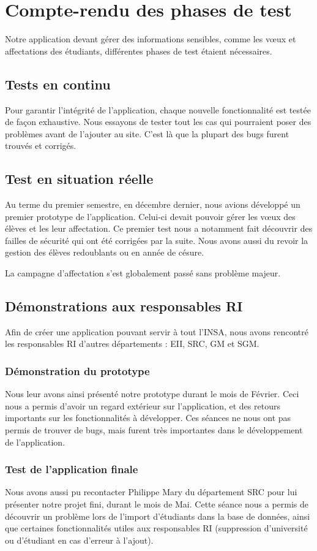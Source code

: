 \chapter{Compte-rendu des phases de test}

Notre application devant gérer des informations sensibles, comme les vœux et affectations des étudiants, différentes phases de test étaient nécessaires. 

\section{Tests en continu}

Pour garantir l'intégrité de l'application, chaque nouvelle fonctionnalité est testée de façon exhaustive. Nous essayons de tester tout les cas qui pourraient poser des problèmes avant de l'ajouter au site. C'est là que la plupart des bugs furent trouvés et corrigés.

\section{Test en situation réelle}
Au terme du premier semestre, en décembre dernier, nous avions développé un premier prototype de l'application. Celui-ci devait pouvoir gérer les vœux des élèves et les leur affectation. 
Ce premier test nous a notamment fait découvrir des failles de sécurité qui ont été corrigées par la suite. Nous avons aussi du revoir la gestion des élèves redoublants ou en année de césure.

La campagne d'affectation s'est globalement passé sans problème majeur.

\section{Démonstrations aux responsables RI}
Afin de créer une application pouvant servir à tout l'INSA, nous avons rencontré les responsables RI d'autres départements : EII, SRC, GM et SGM. 
\subsection{Démonstration du prototype}
Nous leur avons ainsi présenté notre prototype durant le mois de Février. Ceci nous a permis d'avoir un regard extérieur sur l'application, et des retours importants sur les fonctionnalités à développer. Ces séances ne nous ont pas permis de trouver de bugs, mais furent très importantes dans le développement de l'application.
\subsection{Test de l'application finale}
Nous avons aussi pu recontacter Philippe Mary du département SRC pour lui présenter notre projet fini, durant le mois de Mai. Cette séance nous a permis de découvrir un problème lors de l'import d'étudiants dans la base de données, ainsi que certaines fonctionnalités utiles aux responsables RI (suppression d'université ou d'étudiant en cas d'erreur à l'ajout). 

